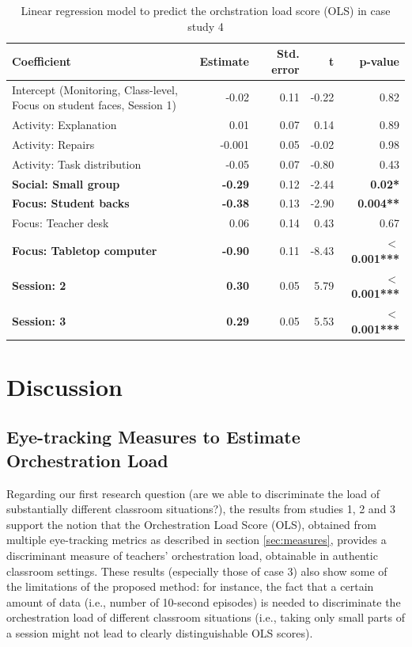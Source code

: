 \documentclass[10pt,journal,compsoc]{IEEEtran}
\begin{document}
\begin{table}[!t]
\caption{Linear regression model to predict the orchstration load score (OLS) in case study 4}
\label{tab:case4results}
\centering
\begin{tabular}{|p{2.6cm}||r|r|r|r|}
\hline
Coefficient & Estimate & Std. error & t & p-value\\
\hline
\hline
Intercept (Monitoring, Class-level, Focus on student faces, Session 1) & -0.02 & 0.11 & -0.22 & 0.82\\
Activity: Explanation & 0.01 & 0.07 & 0.14 & 0.89\\
Activity: Repairs & -0.001 & 0.05 & -0.02 & 0.98\\
Activity: Task distribution & -0.05 & 0.07 & -0.80 & 0.43\\
\textbf{Social: Small group} & \textbf{-0.29} & 0.12 & -2.44 & \textbf{0.02*}\\
\textbf{Focus: Student backs} & \textbf{-0.38} & 0.13 & -2.90 & \textbf{0.004**}\\
Focus: Teacher desk & 0.06 & 0.14 & 0.43 & 0.67\\
\textbf{Focus: Tabletop computer} & \textbf{-0.90} & 0.11 & -8.43 & \textbf{$<$0.001***}\\
\textbf{Session: 2} & \textbf{0.30} & 0.05 & 5.79 & \textbf{$<$0.001***}\\
\textbf{Session: 3} & \textbf{0.29} & 0.05 & 5.53 & \textbf{$<$0.001***}\\
\hline
\end{tabular}
\end{table}


\section{Discussion}
\label{sec:discussion}

\subsection{Eye-tracking Measures to Estimate Orchestration Load}

Regarding our first research question (are we able to discriminate the load of substantially different classroom situations?), the results from studies 1, 2 and 3 support the notion that the Orchestration Load Score (OLS), obtained from multiple eye-tracking metrics as described in section \ref{sec:measures}, provides a discriminant measure of teachers' orchestration load, obtainable in authentic classroom settings. These results (especially those of case 3) also show some of the limitations of the proposed method: for instance, the fact that a certain amount of data (i.e., number of 10-second episodes) is needed to discriminate the orchestration load of different classroom situations (i.e., taking only small parts of a session might not lead to clearly distinguishable OLS scores).
\end{document}
